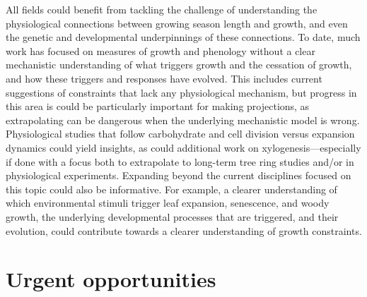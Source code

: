 \documentclass[11pt]{article}
\begin{document}
All fields could benefit from tackling the challenge of understanding the physiological connections between growing season length and growth, and even the genetic and developmental underpinnings of these connections. To date, much work has focused on measures of growth and phenology without a clear mechanistic understanding of what triggers growth and the cessation of growth, and how these triggers and responses have evolved. This includes current suggestions of constraints that lack any physiological mechanism,
 but progress in this area is could be particularly important for making projections, as extrapolating can be dangerous when the underlying mechanistic model is wrong. Physiological studies that follow carbohydrate and cell division versus expansion dynamics could yield insights, as could additional work on xylogenesis---especially if done with a focus both to extrapolate to long-term tree ring studies and/or in physiological experiments. Expanding beyond the current disciplines focused on this topic could also be informative. For example, a clearer understanding of which environmental stimuli trigger leaf expansion, senescence, and woody growth, the underlying developmental processes that are triggered, and their evolution, could contribute towards a clearer understanding of growth constraints.


\section*{Urgent opportunities}

\end{document}
